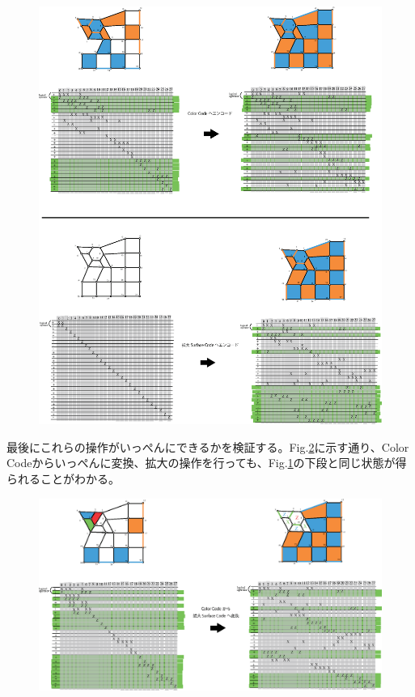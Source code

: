 \documentclass[a4paper,9pt]{ltjsarticle}
\begin{document}
{    \begin{figure}[h]
        \centering
        \includegraphics[scale=0.70]{figure/figure8.eps}
        \vspace{10pt}\caption{}
        \label{figure8}
        \vspace{-15pt}
    \end{figure}
    \clearpage

    最後にこれらの操作がいっぺんにできるかを検証する。Fig.\ref{figure9}に示す通り、Color Codeからいっぺんに変換、拡大の操作を行っても、Fig.\ref{figure8}の下段と同じ状態が得られることがわかる。

    \begin{figure}[h]
        \centering
        \includegraphics[scale=0.70]{figure/figure9.eps}
        \vspace{10pt}\caption{}
        \label{figure9}
        \vspace{-15pt}
    \end{figure}

}
\end{document}
